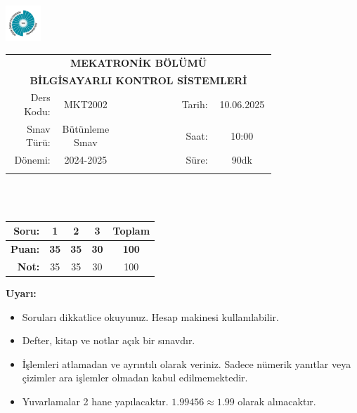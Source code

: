 \newcommand\UniversiteAdi{Niğde Ömer Halisdemir Üniversitesi}
\newcommand\BolumAdi{MEKATRONİK BÖLÜMÜ}
\newcommand\DersKodu{MKT2002}
\newcommand\DersAdi{BİLGİSAYARLI KONTROL SİSTEMLERİ}
\newcommand\SinavAdi{Bütünleme Sınav}
\newcommand\SinavTarihi{10.06.2025}
\newcommand\SinavSaati{10:00}
\newcommand\SinavSuresi{90dk}

\pagestyle{fancy}
\fancyhf{} %
\noindent \includegraphics[width=0.1\textwidth]{logo}
\begin{tabular}{
    p{0.15\linewidth}
    p{0.15\linewidth}
    p{0.2\linewidth}
    p{0.1\linewidth}
    p{0.15\linewidth}}
    \multicolumn{5}{c}{\textbf{\BolumAdi}}\\
    \multicolumn{5}{c}{\textbf{\DersAdi}}\\\hline
    \multicolumn{1}{|r|}{Ders Kodu:}&
    \multicolumn{1}{|c|}{\DersKodu}&
    \multicolumn{1}{|c|}{}& 
    \multicolumn{1}{|r|}{Tarih:}&
    \multicolumn{1}{|c|}{\SinavTarihi} \\\hline
    \multicolumn{1}{|r|}{Sınav Türü:}&
    \multicolumn{1}{|c|}{\SinavAdi}&  
    \multicolumn{1}{|c|}{}&
    \multicolumn{1}{|r|}{Saat:}&
    \multicolumn{1}{|c|}{\SinavSaati}\\\hline
    \multicolumn{1}{|r|}{Dönemi:}&
    \multicolumn{1}{|c|}{2024-2025}&
    \multicolumn{1}{|c|}{}&
    \multicolumn{1}{|r|}{Süre:}&
    \multicolumn{1}{|c|}{\SinavSuresi} \\\hline
    &&&&\\
\end{tabular}\\\\
\noindent\begin{center}
\begin{tabular}{|r|c|c|c|c|}\hline
    \textbf{Soru:}&
    \textbf{1}&
    \textbf{2}&
    \textbf{3}&
    \textbf{Toplam}\\\hline
    \textbf{Puan:}&
    \textbf{35}&
    \textbf{35}&
    \textbf{30}&
    \textbf{100}\\\hline
    \textbf{Not:}&35&35&30&100\\\hline
\end{tabular}\end{center}
\noindent\textbf{Uyarı:}
\begin{itemize}\bfseries
    \item Soruları dikkatlice okuyunuz. Hesap makinesi kullanılabilir.
    \item Defter, kitap ve notlar açık bir sınavdır.
    \item İşlemleri atlamadan ve ayrıntılı olarak veriniz. Sadece nümerik yanıtlar veya çizimler ara işlemler olmadan kabul edilmemektedir.
    \item Yuvarlamalar 2 hane yapılacaktır. $\mathbf{1.99456\approx1.99}$ olarak alınacaktır.
\end{itemize}

